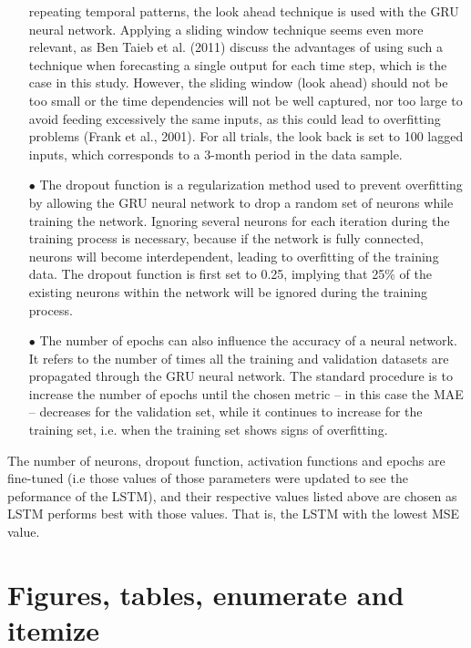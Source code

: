 \documentclass[a4paper,11pt,oneside]{book}
\begin{document}
\begin{itemize}
repeating temporal patterns, the look ahead
technique is used with the GRU neural
network. Applying a sliding window technique seems even more relevant, as
Ben Taieb et al. (2011) discuss the advantages of using such a technique when
forecasting a single output for each time step, which is the case in this study.
However, the sliding window (look ahead) should not be too small or the time
dependencies will not be well captured, nor too large to avoid feeding
excessively the same inputs, as this could lead to overfitting problems (Frank
et al., 2001). For all trials, the look back is set to 100 lagged inputs, which
corresponds to a 3-month period in the data sample.
\item[$\bullet$] The dropout function is a regularization method used to prevent overfitting by
allowing the GRU neural network to drop a random set of neurons while
training the network. Ignoring several neurons for each iteration during the
training process is necessary, because if the network is fully connected,
neurons will become interdependent, leading to overfitting of the training data.
The dropout function is first set to 0.25, implying that 25\% of the existing
neurons within the network will be ignored during the training process.
\item[$\bullet$] The number of epochs can also influence the accuracy of a neural network. It
refers to the number of times all the training and validation datasets are
propagated through the GRU neural network. The standard procedure is to
increase the number of epochs until the chosen metric – in this case the MAE
– decreases for the validation set, while it continues to increase for the training
set, i.e. when the training set shows signs of overfitting.
\end{itemize}

The number of neurons, dropout function, activation functions and epochs are fine-tuned (i.e those values of those parameters were updated to see the peformance of the LSTM), and their respective values listed above are chosen as LSTM performs best with those values. That is, the LSTM with the lowest MSE value.





\chapter{Figures, tables, enumerate and itemize}
\end{document}
